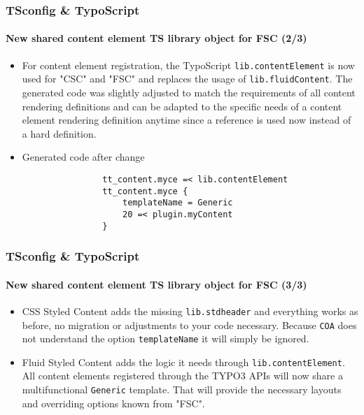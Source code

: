 
\begin{frame}[fragile]
	\frametitle{TSconfig \& TypoScript}
	\framesubtitle{New shared content element TS library object for FSC (2/3)}

	\begin{itemize}
		\item For content element registration, the TypoScript \texttt{lib.contentElement} is now
			used for "CSC" and "FSC" and replaces the usage of \texttt{lib.fluidContent}. The
			generated code was slightly adjusted to match the requirements of all content rendering
			definitions and can be adapted to the specific needs of a content element rendering
			definition anytime since a reference is used now instead of a hard definition.

		\item Generated code after change

			\begin{lstlisting}
				tt_content.myce =< lib.contentElement
				tt_content.myce {
				    templateName = Generic
				    20 =< plugin.myContent
				}
			\end{lstlisting}
	\end{itemize}

\end{frame}


\begin{frame}[fragile]
	\frametitle{TSconfig \& TypoScript}
	\framesubtitle{New shared content element TS library object for FSC (3/3)}

	\begin{itemize}
		\item CSS Styled Content adds the missing \texttt{lib.stdheader} and everything works as
			before, no migration or adjustments to your code necessary. Because \texttt{COA} does
			not understand the option \texttt{templateName} it will simply be ignored.

		\item Fluid Styled Content adds the logic it needs through \texttt{lib.contentElement}.
			All content elements registered through the TYPO3 APIs will now share a multifunctional
			\texttt{Generic} template. That will provide the necessary layouts and overriding options
			known from "FSC".

	\end{itemize}
\end{frame}


